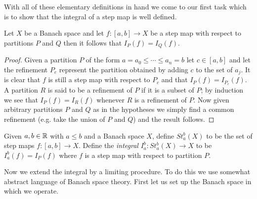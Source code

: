 With all of these elementary definitions in hand we come to our first
task which is to show that the integral of a step map is well defined.
\begin{prop}Let $X$ be a Banach space and let $f : [a,b] \to X$ be a
  step map with respect to partitions $P$ and $Q$ then it follows that
  $I_P(f) = I_Q(f)$.
\end{prop}
\begin{proof}
Given a partition $P$ of the form $a=a_0 \leq \dotsb \leq a_n=b$ let
$c \in [a,b]$ and let the refinement $P_c$ represent the partition
obtained by adding $c$ to the set of $a_j$.  It is clear that $f$ is
still a step map with respect to $P_c$ and that $I_P(f)
= I_{P_c}(f)$.  A partition $R$ is said to be a refinement of $P$ if
it is a subset of $P$; by induction we see that $I_P(f) = I_R(f)$
whenever $R$ is a refinement of $P$.  Now given arbitrary partitions
$P$ and $Q$ as in the hypotheses we simply find a common refinement
(e.g. take the union of $P$ and $Q$) and the result follows.
\end{proof}

\begin{defn}Given $a, b \in \mathbb{R}$ with $a \leq b$ and a Banach space $X$,
  define $St_a^b(X)$ to be the set of step maps $f : [a,b] \to X$.   Define the \emph{integral}
  $I_a^b : St_a^b(X) \to X$ to be $I_a^b(f) = I_P(f)$ where $f$ is a step map with respect to
  partition $P$.
\end{defn}

Now we extend the integral by a limiting procedure.  To do this we use 
somewhat abstract language of Banach space theory.  First let us set
up the Banach space in which we operate.

